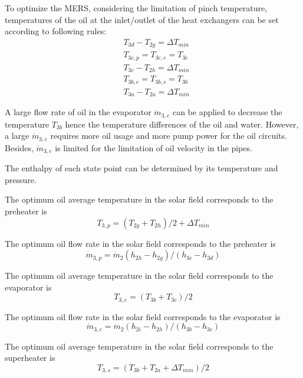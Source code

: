 To optimize the MERS, considering the limitation of pinch temperature, temperatures of the oil at the inlet/outlet of the heat exchangers can be set according to following rules:
\begin{eqnarray*}
	&T_{3d} - T_{2g} = \Delta T_{min}\\
   &T_{3c,p} = T_{3c,e} = T_{3c}\\
   &T_{3c} - T_{2h} = \Delta T_{min}\\
	&T_{3b,e} = T_{3b,s} = T_{3b}\\
	&T_{3a} - T_{2a} = \Delta T_{min}
\end{eqnarray*}


A large flow rate of oil in the evaporator $\dot{m}_{3,e}$ can be applied to decrease the temperature $T_{3b}$ hence the temperature differences of the oil and water. However, a large $\dot{m}_{3,e}$ requires more oil usage and more pump power for the oil circuits. Besides, $\dot{m}_{3,e}$ is limited for the limitation of oil velocity in the pipes.

The enthalpy of each state point can be determined by its temperature and pressure.

The optimum oil average temperature in the solar field corresponds to the preheater is
\begin{equation}
  T_{3,p} = (T_{2g} + T_{2h})/2 + \Delta T_{min}
\end{equation}

The optimum oil flow rate in the solar field corresponds to the preheater is
\begin{equation}
  \dot{m}_{3,p} = \dot{m}_{2}(h_{2h} - h_{2g})/(h_{3c} - h_{3d})
\end{equation}

The optimum oil average temperature in the solar field corresponds to the evaporator is
\begin{equation}
  T_{3,e} = (T_{3b} + T_{3c})/2
\end{equation}

The optimum oil flow rate in the solar field corresponds to the evaporator is
\begin{equation}\label{eq:m_3e}
  \dot{m}_{3,e} = \dot{m}_{2}(h_{2i} - h_{2h})/(h_{3b} - h_{3c})
\end{equation}

The optimum oil average temperature in the solar field corresponds to the superheater is
\begin{equation}
  T_{3,s} = (T_{3b} + T_{2a} + \Delta T_{min})/2
\end{equation}

